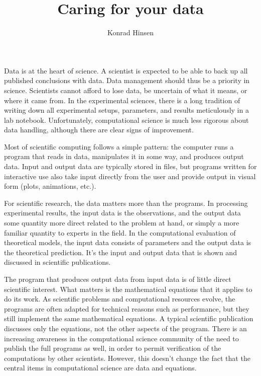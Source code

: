 \documentclass{csmagazine}
\title{Caring for your data}
\author{%
	Konrad Hinsen \ieeecsAffiliation{Centre de Biophysique Moléculaire, Orléans, France}\\
}
\begin{document}

\ieeecsArticleTitle

\ieeecsInsertAuthor



\newcommand{\url}[1]{#1}


Data is at the heart of science. A scientist is expected to be able to back up all published conclusions with data. Data management should thus be a priority in science. Scientists cannot afford to lose data, be uncertain of what it means, or where it came from. In the experimental sciences, there is a long tradition of writing down all experimental setups, parameters, and results meticulously in a lab notebook. Unfortunately, computational science is much less rigorous about data handling, although there are clear signs of improvement.

Most of scientific computing follows a simple pattern: the computer runs a program that reads in data, manipulates it in some way, and produces output data. Input and output data are typically stored in files, but programs written for interactive use also take input directly from the user and provide output in visual form (plots, animations, etc.).

For scientific research, the data matters more than the programs. In processing experimental results, the input data is the observations, and the output data some quantity more direct related to the problem at hand, or simply a more familiar quantity to experts in the field. In the computational evaluation of theoretical models, the input data consists of parameters and the output data is the theoretical prediction. It's the input and output data that is shown and discussed in scientific publications.

The program that produces output data from input data is of little direct scientific interest. What matters is the mathematical equations that it applies to do its work. As scientific problems and computational resources evolve, the programs are often adapted for technical reasons such as performance, but they still implement the same mathematical equations. A typical scientific publication discusses only the equations, not the other aspects of the program. There is an increasing awareness in the computational science community of the need to publish the full programs as well, in order to permit verification of the computations by other scientists. However, this doesn't change the fact that the central items in computational science are data and equations.
\end{document}
